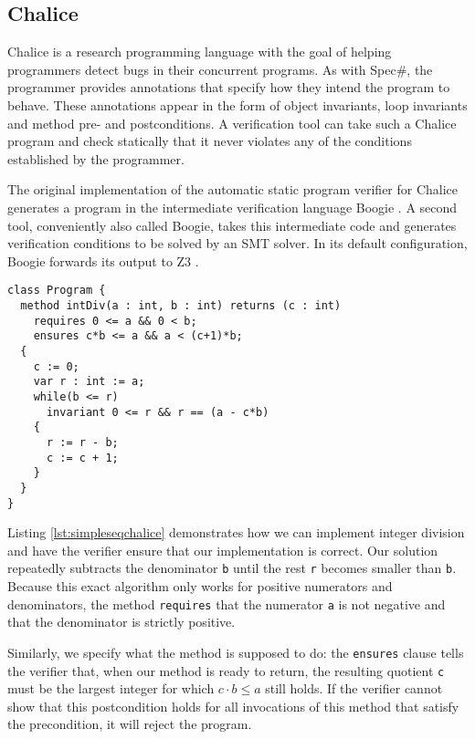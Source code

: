 
\subsection{Chalice}
Chalice is a research programming language with the goal of helping programmers detect bugs in their concurrent programs. As with Spec\#, the programmer provides annotations that specify how they intend the program to behave.
These annotations appear in the form of object invariants, loop invariants and method pre- and postconditions.
A verification tool can take such a Chalice program and check statically that it never violates any of the conditions established by the programmer.

The original implementation of the automatic static program verifier for Chalice generates a program in the intermediate verification language Boogie \cite{ByECD+06}.
A second tool, conveniently also called Boogie, takes this intermediate code and generates verification conditions to be solved by an SMT solver.
In its default configuration, Boogie forwards its output to Z3 \cite{dMB08}.

\begin{lstlisting}[language=Chalice,float,caption={Loop invariants, pre- and post conditions in a Chalice program},label=lst:simpleseqchalice]
class Program {
  method intDiv(a : int, b : int) returns (c : int)
    requires 0 <= a && 0 < b;
    ensures c*b <= a && a < (c+1)*b;
  {
    c := 0;
    var r : int := a;
    while(b <= r)
      invariant 0 <= r && r == (a - c*b)
    {
      r := r - b;
      c := c + 1;
    }
  }
}
\end{lstlisting}

Listing \ref{lst:simpleseqchalice} demonstrates how we can implement integer division and have the verifier ensure that our implementation is correct.
Our solution repeatedly subtracts the denominator \lstinline!b! until the rest \lstinline!r! becomes smaller than \lstinline!b!. 
Because this exact algorithm only works for positive numerators and denominators, the method \lstinline[language=chalice]!requires! that the numerator \lstinline!a! is not negative and that the denominator is strictly positive.

Similarly, we specify what the method is supposed to do: the \lstinline[language=Chalice]!ensures! clause tells the verifier that, when our method is ready to return, the resulting quotient \lstinline!c! must be the largest integer for which $c \cdot b \leq a$ still holds.
If the verifier cannot show that this postcondition holds for all invocations of this method that satisfy the precondition, it will reject the program.

